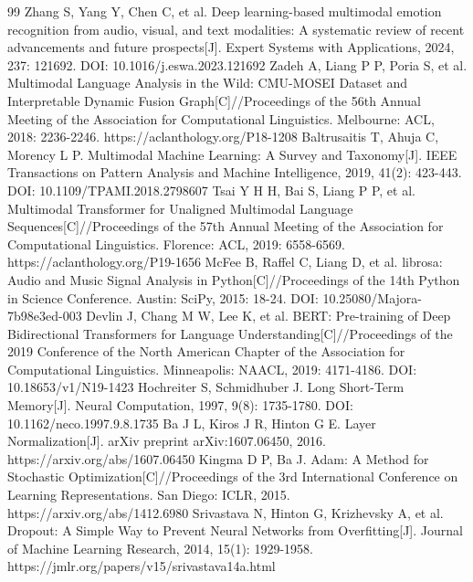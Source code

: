 \documentclass[bwprint]{gmcmthesis}
\begin{document}
\begin{thebibliography}{99}
 Zhang S, Yang Y, Chen C, et al. Deep learning-based multimodal emotion recognition from audio, visual, and text modalities: A systematic review of recent advancements and future prospects[J]. Expert Systems with Applications, 2024, 237: 121692. DOI: 10.1016/j.eswa.2023.121692
 Zadeh A, Liang P P, Poria S, et al. Multimodal Language Analysis in the Wild: CMU-MOSEI Dataset and Interpretable Dynamic Fusion Graph[C]//Proceedings of the 56th Annual Meeting of the Association for Computational Linguistics. Melbourne: ACL, 2018: 2236-2246. https://aclanthology.org/P18-1208
 Baltrusaitis T, Ahuja C, Morency L P. Multimodal Machine Learning: A Survey and Taxonomy[J]. IEEE Transactions on Pattern Analysis and Machine Intelligence, 2019, 41(2): 423-443. DOI: 10.1109/TPAMI.2018.2798607
 Tsai Y H H, Bai S, Liang P P, et al. Multimodal Transformer for Unaligned Multimodal Language Sequences[C]//Proceedings of the 57th Annual Meeting of the Association for Computational Linguistics. Florence: ACL, 2019: 6558-6569. https://aclanthology.org/P19-1656
 McFee B, Raffel C, Liang D, et al. librosa: Audio and Music Signal Analysis in Python[C]//Proceedings of the 14th Python in Science Conference. Austin: SciPy, 2015: 18-24. DOI: 10.25080/Majora-7b98e3ed-003
 Devlin J, Chang M W, Lee K, et al. BERT: Pre-training of Deep Bidirectional Transformers for Language Understanding[C]//Proceedings of the 2019 Conference of the North American Chapter of the Association for Computational Linguistics. Minneapolis: NAACL, 2019: 4171-4186. DOI: 10.18653/v1/N19-1423
 Hochreiter S, Schmidhuber J. Long Short-Term Memory[J]. Neural Computation, 1997, 9(8): 1735-1780. DOI: 10.1162/neco.1997.9.8.1735
 Ba J L, Kiros J R, Hinton G E. Layer Normalization[J]. arXiv preprint arXiv:1607.06450, 2016. https://arxiv.org/abs/1607.06450
 Kingma D P, Ba J. Adam: A Method for Stochastic Optimization[C]//Proceedings of the 3rd International Conference on Learning Representations. San Diego: ICLR, 2015. https://arxiv.org/abs/1412.6980
 Srivastava N, Hinton G, Krizhevsky A, et al. Dropout: A Simple Way to Prevent Neural Networks from Overfitting[J]. Journal of Machine Learning Research, 2014, 15(1): 1929-1958. https://jmlr.org/papers/v15/srivastava14a.html

\end{thebibliography}
\end{document}
